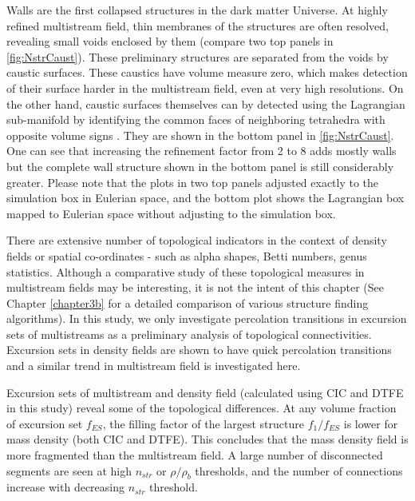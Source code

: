 Walls are the first collapsed structures in the dark matter Universe. At highly refined multistream field, thin membranes of the structures are often resolved, revealing small voids enclosed by them (compare two top panels in \autoref{fig:NstrCaust}). These preliminary structures are separated from the voids by caustic surfaces. These caustics have volume measure zero, which makes detection of their surface harder in the multistream field, even at very high resolutions. On the other hand, caustic surfaces themselves can by detected using the Lagrangian sub-manifold by identifying the common faces of neighboring tetrahedra 
with opposite volume signs \citep{Shandarin2012}. They are shown in the bottom panel in  \autoref{fig:NstrCaust}. One can see that increasing the refinement factor from 2 to 8 adds mostly walls but the complete wall structure shown in the bottom panel is still considerably greater. Please note that the plots in  two top panels adjusted  exactly to the simulation box in Eulerian space, and the bottom plot shows the Lagrangian box mapped to Eulerian space without adjusting to the simulation box.

There are extensive number of topological indicators in the context of density fields or spatial co-ordinates - such as alpha shapes, Betti numbers, genus statistics. Although a comparative study of these topological measures in multistream fields may be interesting, it is not the intent of this chapter (See Chapter \ref{chapter3b} for a detailed comparison of various structure finding algorithms). In this study, we only investigate percolation transitions in excursion sets of multistreams as a preliminary analysis of topological connectivities. Excursion sets in density fields are shown to have quick percolation transitions \citep{Shandarin2010b} and a similar trend in multistream field is investigated here.


Excursion sets of multistream and density field (calculated using CIC and DTFE in this study) reveal some of the topological differences. At any volume fraction of excursion set $f_{ES}$, the filling factor of the largest structure $f_{1}/f_{ES}$ is lower for mass density (both CIC and DTFE). This concludes that the mass density field is more fragmented than the multistream field. A large number of disconnected segments are seen at high $n_{str}$ or $\rho/ \rho_b$ thresholds, and the number of connections increase with decreasing $n_{str}$ threshold.
  

